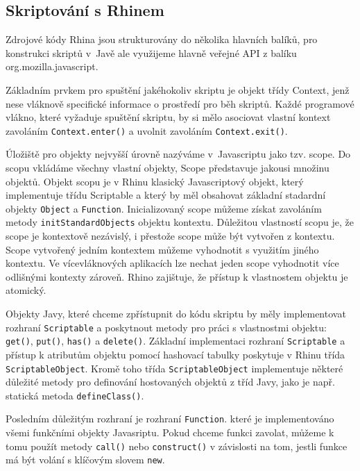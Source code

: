 \subsection{Skriptování s Rhinem}
\label{Chapter.JavaScriptInJavaAnalysis.Rhino.ScriptingWithRhino}

Zdrojové kódy Rhina jsou strukturovány do několika hlavních balíků, pro konstrukci skriptů v~Javě ale využijeme hlavně veřejné API z balíku org.mozilla.javascript.

Základním prvkem pro spuštění jakéhokoliv skriptu je objekt třídy Context, jenž nese vláknově specifické informace o prostředí pro běh skriptů. Každé programové vlákno, které vyžaduje spuštění skriptu, by si mělo asociovat vlastní kontext zavoláním \texttt{Context.enter()} a uvolnit zavoláním \texttt{Context.exit()}. \cite{Bibliography.Rhino.ScopesAndContexts}

Úložiště pro objekty nejvyšší úrovně nazýváme v~Javascriptu jako tzv. scope. Do scopu vkládáme všechny vlastní objekty, Scope představuje jakousi množinu objektů. Objekt scopu je v Rhinu klasický Javascriptový objekt, který implementuje třídu Scriptable a který by měl obsahovat základní stadardní objekty \texttt{Object} a \texttt{Function}. Inicializovaný scope můžeme získat zavoláním metody \texttt{initStandardObjects} objektu kontextu. Důležitou vlastností scopu je, že scope je kontextově nezávislý, i přestože scope může být vytvořen z kontextu. Scope vytvořený jedním kontextem můžeme vyhodnotit s využitím jiného kontextu. Ve vícevláknových aplikacích lze nechat jeden scope vyhodnotit více odlišnými kontexty zároveň. Rhino zajištuje, že přístup k vlastnostem objektu je atomický. \cite{Bibliography.Rhino.ScopesAndContexts}

Objekty Javy, které chceme zpřístupnit do kódu skriptu by měly implementovat rozhraní \texttt{Scriptable} a poskytnout metody pro práci s vlastnostmi objektu: \texttt{get()}, \texttt{put()}, \texttt{has()} a \texttt{delete()}. Základní implementaci rozhraní \texttt{Scriptable} a přístup k atributům objektu pomocí hashovací tabulky poskytuje v Rhinu třída \texttt{ScriptableObject}. Kromě toho třída \texttt{ScriptableObject} implementuje některé důležité metody pro definování hostovaných objektů z tříd Javy, jako je např. statická metoda \texttt{defineClass()}.

Posledním důležitým rozhraní je rozhraní \texttt{Function}. které je implementováno všemi funkčními objekty Javasriptu. Pokud chceme funkci zavolat, můžeme k tomu použít metody \texttt{call()} nebo \texttt{construct()} v závislosti na tom, jestli funkce má být volání s klíčovým slovem \texttt{new}.

